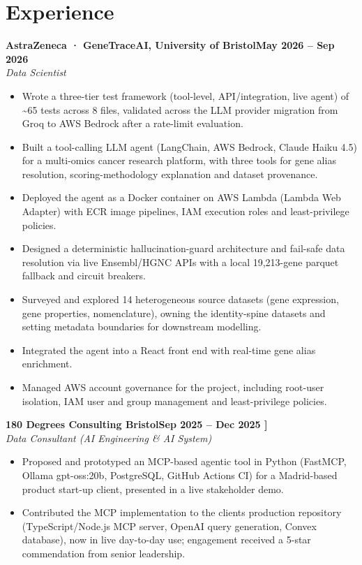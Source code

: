 \documentclass[a4paper,11pt]{article}
\newcommand{\entry}[4]{\needspace{4\baselineskip}\noindent\textbf{#1}\hfill\textbf{#2}\\ \textit{#3}\hfill\textit{#4}\par}
\begin{document}
\section{Experience}
\entry{AstraZeneca · GeneTraceAI, University of Bristol}{May 2026 – Sep 2026}{Data Scientist}{}
\begin{itemize}
  \item Wrote a three-tier test framework (tool-level, API/integration, live agent) of \textasciitilde{}65 tests across 8 files, validated across the LLM provider migration from Groq to AWS Bedrock after a rate-limit evaluation.
  \item Built a tool-calling LLM agent (LangChain, AWS Bedrock, Claude Haiku 4.5) for a multi-omics cancer research platform, with three tools for gene alias resolution, scoring-methodology explanation and dataset provenance.
  \item Deployed the agent as a Docker container on AWS Lambda (Lambda Web Adapter) with ECR image pipelines, IAM execution roles and least-privilege policies.
  \item Designed a deterministic hallucination-guard architecture and fail-safe data resolution via live Ensembl/HGNC APIs with a local 19,213-gene parquet fallback and circuit breakers.
  \item Surveyed and explored 14 heterogeneous source datasets (gene expression, gene properties, nomenclature), owning the identity-spine datasets and setting metadata boundaries for downstream modelling.
  \item Integrated the agent into a React front end with real-time gene alias enrichment.
  \item Managed AWS account governance for the project, including root-user isolation, IAM user and group management and least-privilege policies.
\end{itemize}
\vspace{4pt}
\entry{180 Degrees Consulting Bristol}{Sep 2025 – Dec 2025   ]}{Data Consultant (AI Engineering \& AI System)}{}
\begin{itemize}
  \item Proposed and prototyped an MCP-based agentic tool in Python (FastMCP, Ollama gpt-oss:20b, PostgreSQL, GitHub Actions CI) for a Madrid-based product start-up client, presented in a live stakeholder demo.
  \item Contributed the MCP implementation to the client\textquotesingle{}s production repository (TypeScript/Node.js MCP server, OpenAI query generation, Convex database), now in live day-to-day use; engagement received a 5-star commendation from senior leadership.
\end{itemize}
\end{document}
